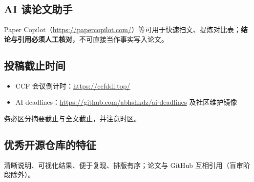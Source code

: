 \subsection{AI 读论文助手}
Paper Copilot（\url{https://papercopilot.com/}）等可用于快速扫文、提炼对比表；\textbf{结论与引用必须人工核对}，不可直接当作事实写入论文。

\subsection{投稿截止时间}
\begin{itemize}
  \item CCF 会议倒计时：\url{https://ccfddl.top/}
  \item AI deadlines：\url{https://github.com/abhshkdz/ai-deadlines} 及社区维护镜像
\end{itemize}
务必区分摘要截止与全文截止，并注意时区。

\subsection{优秀开源仓库的特征}
清晰说明、可视化结果、便于复现、排版有序；论文与 GitHub 互相引用（盲审阶段除外）。
